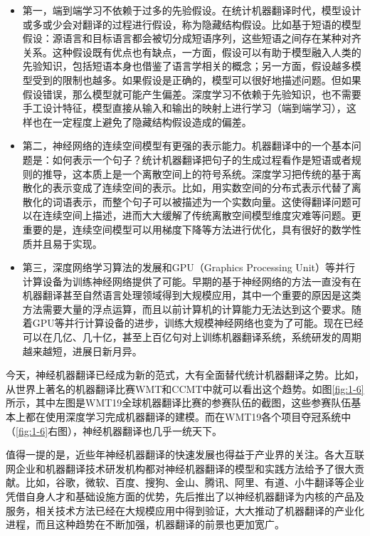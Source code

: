 \begin{itemize}
\vspace{0.5em}
\item 第一，端到端学习不依赖于过多的先验假设。在统计机器翻译时代，模型设计或多或少会对翻译的过程进行假设，称为隐藏结构假设。比如基于短语的模型假设：源语言和目标语言都会被切分成短语序列，这些短语之间存在某种对齐关系。这种假设既有优点也有缺点，一方面，假设可以有助于模型融入人类的先验知识，包括短语本身也借鉴了语言学相关的概念；另一方面，假设越多模型受到的限制也越多。如果假设是正确的，模型可以很好地描述问题。但如果假设错误，那么模型就可能产生偏差。深度学习不依赖于先验知识，也不需要手工设计特征，模型直接从输入和输出的映射上进行学习（端到端学习），这样也在一定程度上避免了隐藏结构假设造成的偏差。
\vspace{0.5em}
\item 第二，神经网络的连续空间模型有更强的表示能力。机器翻译中的一个基本问题是：如何表示一个句子？统计机器翻译把句子的生成过程看作是短语或者规则的推导，这本质上是一个离散空间上的符号系统。深度学习把传统的基于离散化的表示变成了连续空间的表示。比如，用实数空间的分布式表示代替了离散化的词语表示，而整个句子可以被描述为一个实数向量。这使得翻译问题可以在连续空间上描述，进而大大缓解了传统离散空间模型维度灾难等问题。更重要的是，连续空间模型可以用梯度下降等方法进行优化，具有很好的数学性质并且易于实现。
\vspace{0.5em}
\item 第三，深度网络学习算法的发展和GPU（Graphics Processing Unit）等并行计算设备为训练神经网络提供了可能。早期的基于神经网络的方法一直没有在机器翻译甚至自然语言处理领域得到大规模应用，其中一个重要的原因是这类方法需要大量的浮点运算，而且以前计算机的计算能力无法达到这个要求。随着GPU等并行计算设备的进步，训练大规模神经网络也变为了可能。现在已经可以在几亿、几十亿，甚至上百亿句对上训练机器翻译系统，系统研发的周期越来越短，进展日新月异。
\vspace{0.5em}
\end{itemize}

\parinterval 今天，神经机器翻译已经成为新的范式，大有全面替代统计机器翻译之势。比如，从世界上著名的机器翻译比赛WMT和CCMT中就可以看出这个趋势。如图\ref{fig:1-6}所示，其中左图是WMT19全球机器翻译比赛的参赛队伍的截图，这些参赛队伍基本上都在使用深度学习完成机器翻译的建模。而在WMT19各个项目夺冠系统中（\ref{fig:1-6}右图），神经机器翻译也几乎一统天下。

\parinterval 值得一提的是，近些年神经机器翻译的快速发展也得益于产业界的关注。各大互联网企业和机器翻译技术研发机构都对神经机器翻译的模型和实践方法给予了很大贡献。比如，谷歌，微软、百度、搜狗、金山、腾讯、阿里、有道、小牛翻译等企业凭借自身人才和基础设施方面的优势，先后推出了以神经机器翻译为内核的产品及服务，相关技术方法已经在大规模应用中得到验证，大大推动了机器翻译的产业化进程，而且这种趋势在不断加强，机器翻译的前景也更加宽广。

